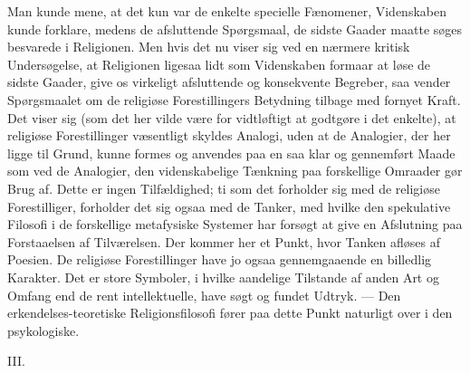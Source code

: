 \documentclass[12pt,a4paper]{article}
\newcommand{\snum}[1]{\bigskip\begin{center}#1\end{center}\nopagebreak\medskip}
\begin{document}
Man kunde mene, at det kun var de enkelte specielle Fænomener, Videnskaben
kunde forklare, medens de afsluttende Spørgsmaal, de sidste Gaader maatte
søges besvarede i Religionen. Men hvis det nu viser sig ved en nærmere kritisk
Undersøgelse, at Religionen ligesaa lidt som Videnskaben formaar at løse de
sidste Gaader, give os virkeligt afsluttende og konsekvente Begreber, saa
vender Spørgsmaalet om de religiøse Forestillingers Betydning tilbage med
fornyet Kraft. Det viser sig (som det her vilde være for vidtløftigt at
godtgøre i det enkelte), at religiøse Forestillinger væsentligt skyldes
Analogi, uden at de Analogier, der her ligge til Grund, kunne formes og
anvendes paa en saa klar og gennemført Maade som ved de Analogier, den
videnskabelige Tænkning paa forskellige Omraader gør Brug af. Dette er ingen
Tilfældighed; ti som det
forholder sig med de religiøse Forestilliger, forholder det sig ogsaa med de
Tanker, med hvilke den spekulative Filosofi i de forskellige metafysiske
Systemer har forsøgt at give en Afslutning paa Forstaaelsen af Tilværelsen.
Der kommer her et Punkt, hvor Tanken afløses af Poesien. De religiøse
Forestillinger have jo ogsaa gennemgaaende en billedlig Karakter. Det er store
Symboler, i hvilke aandelige Tilstande af anden Art og Omfang end de rent
intellektuelle, have søgt og fundet Udtryk. --- Den erkendelses-teoretiske
Religionsfilosofi fører paa dette Punkt naturligt over i den psykologiske.

\snum{III.}
\end{document}
